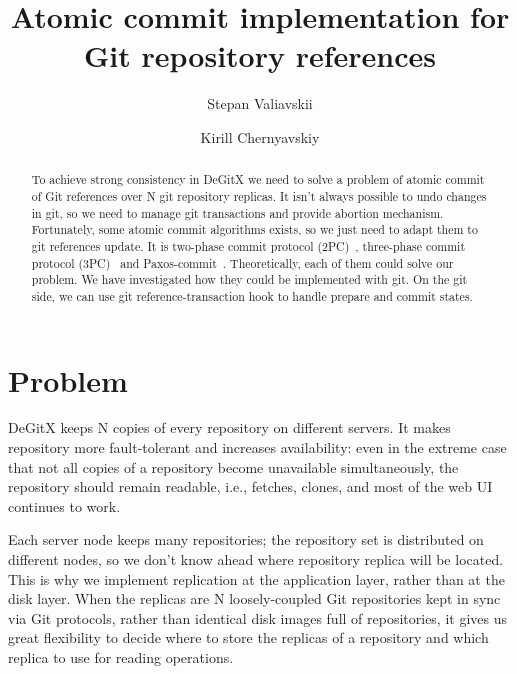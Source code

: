 \documentclass[sigplan, screen, nonacm, 11pt]{acmart}
\title{Atomic commit implementation for Git repository references}
\author{Stepan Valiavskii}
\author{Kirill Chernyavskiy}
\begin{document}
\begin{abstract}
  To achieve strong consistency in DeGitX we need to solve a problem of atomic commit of Git references
  over N git repository replicas.
  It isn't always possible to undo changes in git, so we need to manage git transactions
  and provide abortion mechanism.
  Fortunately, some atomic commit algorithms exists, so we just need to adapt them to git references update.
  It is two-phase commit protocol (2PC)~\cite{2pc}, three-phase commit protocol (3PC)~\cite{3pc} and Paxos-commit~\cite{paxos-commit}.
  Theoretically, each of them could solve our problem.
  We have investigated how they could be implemented with git.
  On the git side, we can use git reference-transaction hook to handle prepare and commit states.
\end{abstract}

\maketitle

\section{Problem}

DeGitX keeps N copies of every repository on different servers.
It makes repository more fault-tolerant and increases availability:
even in the extreme case that not all copies of a repository become unavailable simultaneously,
the repository should remain readable, i.e., fetches, clones, and
most of the web UI continues to work.

Each server node keeps many repositories; the repository set is distributed on different nodes,
so we don't know ahead where repository replica will be located.
This is why we implement replication at the application layer, rather than at the disk layer.
When the replicas are N loosely-coupled Git repositories kept
in sync via Git protocols, rather than identical disk images full of repositories,
it gives us great flexibility to decide where to
store the replicas of a repository and which replica to use for reading operations.
\end{document}
